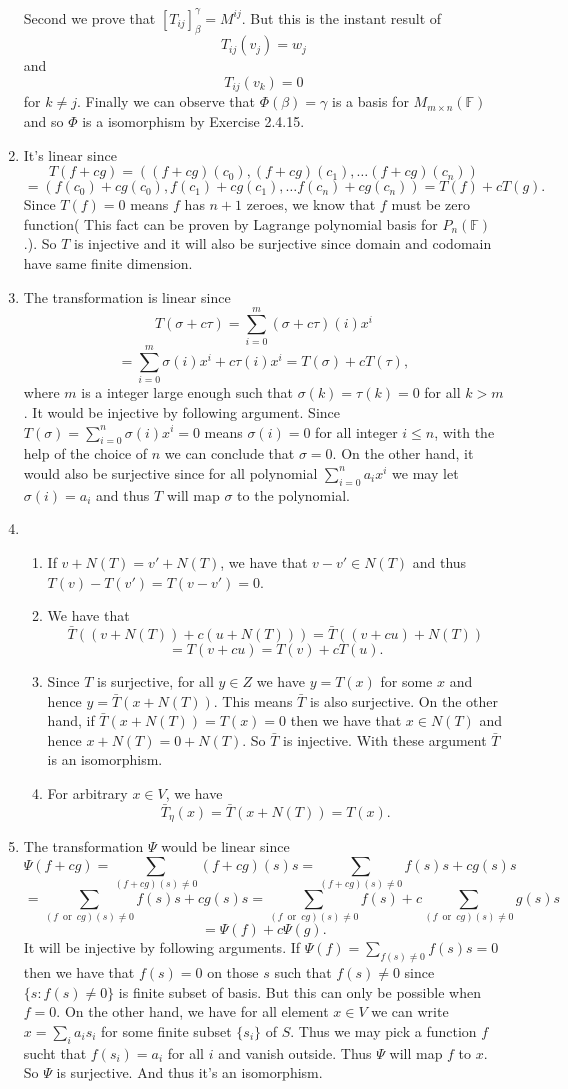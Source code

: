 \begin{enumerate}
Second we prove that $[T_{ij}]_{\beta}^{\gamma}=M^{ij}$. But this is the instant result of 
\[T_{ij}(v_j)=w_j\]
and 
\[T_{ij}(v_k)=0\]
for $k\neq j$. Finally we can observe that $\Phi(\beta )=\gamma $ is a basis for $M_{m\times n}(\mathbb{F})$ and so $\Phi $ is a isomorphism by Exercise 2.4.15.
\item It's linear since 
\[T(f+cg)=((f+cg)(c_0),(f+cg)(c_1),\ldots (f+cg)(c_n))\]
\[=(f(c_0)+cg(c_0),f(c_1)+cg(c_1),\ldots f(c_n)+cg(c_n))=T(f)+cT(g).\]
Since $T(f)=0$ means $f$ has $n+1$ zeroes, we know that $f$ must be zero function( This fact can be proven by Lagrange polynomial basis for $P_n(\mathbb{F})$.). So $T$ is injective and it will also be surjective since domain and codomain have same finite dimension.
\item The transformation is linear since 
\[T(\sigma +c\tau )=\sum_{i=0}^m{(\sigma +c\tau )(i)x^i}\]
\[=\sum_{i=0}^m{\sigma (i)x^i+c\tau (i)x^i}=T(\sigma )+cT(\tau ),\]
where $m$ is a integer large enough such that $\sigma (k)=\tau (k)=0$ for all $k>m$.
It would be injective by following argument. Since $T(\sigma )=\sum_{i=0}^n{\sigma (i)x^i}=0$ means $\sigma (i)=0$ for all integer $i\leq n$, with the help of the choice of $n$ we can conclude that $\sigma =0$. On the other hand, it would also be surjective since for all polynomial $\sum_{i=0}^n{a_ix^i}$ we may let $\sigma (i)=a_i$ and thus $T$ will map $\sigma $ to the polynomial.
\item \begin{enumerate}
\item If $v+N(T)=v'+N(T)$, we have that $v-v'\in N(T)$ and thus $T(v)-T(v')=T(v-v')=0$.
\item We have that 
\[\bar{T}((v+N(T))+c(u+N(T)))=\bar{T}((v+cu)+N(T))\]
\[=T(v+cu)=T(v)+cT(u).\]
\item Since $T$ is surjective, for all $y\in Z$ we have $y=T(x)$ for some $x$ and hence $y=\bar{T}(x+N(T))$. This means $\bar{T}$ is also surjective. On the other hand, if $\bar{T}(x+N(T))=T(x)=0$ then we have that $x\in N(T)$ and hence $x+N(T)=0+N(T)$. So $\bar{T}$ is injective. With these argument $\bar{T}$ is an isomorphism.
\item For arbitrary $x\in V$, we have 
\[\bar{T}_{\eta }(x)=\bar{T}(x+N(T))=T(x).\]
\end{enumerate}
\item The transformation $\Psi $ would be linear since 
\[\Psi(f+cg)=\sum_{(f+cg)(s)\neq 0}{(f+cg)(s)s}=\sum_{(f+cg)(s)\neq 0}{f(s)s+cg(s)s}\]
\[=\sum_{(f\enspace \mathrm{or} \enspace cg)(s)\neq 0}{f(s)s+cg(s)s}=\sum_{(f\enspace \mathrm{or} \enspace cg)(s)\neq 0}{f(s)}+c\sum_{(f\enspace \mathrm{or} \enspace cg)(s)\neq 0}{g(s)s}\]
\[=\Psi(f)+c\Psi(g).\]
It will be injective by following arguments. If $\Psi(f)=\sum_{f(s)\neq 0}{f(s)s}=0$ then we have that $f(s)=0$ on those $s$ such that $f(s)\neq 0$ since $\{s:f(s)\neq 0\}$ is finite subset of basis. But this can only be possible when $f=0$. On the other hand, we have for all element $x\in V$ we can write $x=\sum_{i}{a_is_i}$ for some finite subset $\{s_i\}$ of $S$. Thus we may pick a function $f$ sucht that $f(s_i)=a_i$ for all $i$ and vanish outside. Thus $\Psi $ will map $f$ to $x$. So $\Psi $ is surjective. And thus it's an isomorphism.
\end{enumerate}